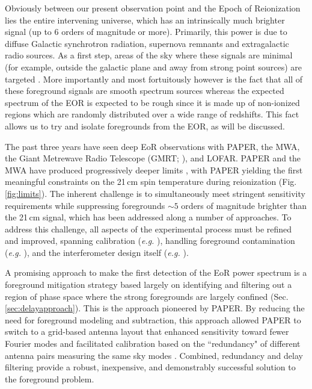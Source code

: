 \documentclass[preprint,11pt]{aastex}
\begin{document}
Obviously between our present observation point and the Epoch of Reionization lies the entire intervening universe, which has an intrinsically much brighter signal (up to 6 orders of magnitude or more).  Primarily, this power is due to diffuse Galactic synchrotron radiation, supernova remnants and extragalactic radio sources.  As a first step, areas of the sky where these signals are minimal (for example, outside the galactic plane and away from strong point sources) are targeted \citep{bernardi_2013}.  More importantly and most fortuitously however is the fact that all of these foreground signals are smooth spectrum sources whereas the expected spectrum of the EOR is expected to be rough since it is made up of non-ionized regions which are randomly distributed over a wide range of redshifts.  This fact allows us to try and isolate foregrounds from the EOR, as will be discussed.

The past three years have seen deep EoR observations with PAPER, the MWA, 
the Giant Metrewave Radio Telescope (GMRT; \citealt{paciga_et_al2013}), and LOFAR.
PAPER and the MWA have produced progressively deeper limits
\citep{dillon_et_al2014,dillon_et_al2015,parsons_etal2014,ali_et_al2015}, with PAPER
yielding the first meaningful constraints on the 21\,cm spin temperature during reionization
(Fig. \ref{fig:limits}). %
The inherent challenge is to simultaneously meet stringent sensitivity requirements 
while suppressing foregrounds $\sim5$ orders of magnitude
brighter than the 21\,cm signal, which has been addressed along a number of approaches.  
To address this challenge,  all aspects of the experimental process must be refined and improved, spanning 
calibration ({\em e.g.} \cite{zheng_et_al2014, jacobs_et_al2016, barry_et_al2016}), handling foreground contamination
({\em e.g.} \cite{moore_et_al2013,moore_et_al2016,thyagarajan_et_al2015a,pober_et_al2016}),
and the interferometer design itself ({\em e.g.} \cite{parsons_et_al2012a,dillon_parsons2016}).

A promising approach to make the first detection of the EoR power spectrum 
is a foreground mitigation strategy based largely
on identifying and filtering out a region of phase space where the strong foregrounds are largely confined (Sec. \ref{sec:delayapproach}).  This is the approach
pioneered by PAPER.
By reducing the need
for foreground modeling and subtraction, this approach allowed PAPER to switch to a grid-based antenna layout that
enhanced sensitivity toward fewer Fourier modes and facilitated calibration
based on the ``redundancy" of different antenna pairs measuring the same sky modes \citep{liu_et_al2010,zheng_et_al2014}.
Combined, redundancy and delay filtering provide a robust, inexpensive, and demonstrably successful solution 
to the foreground problem.
\end{document}
